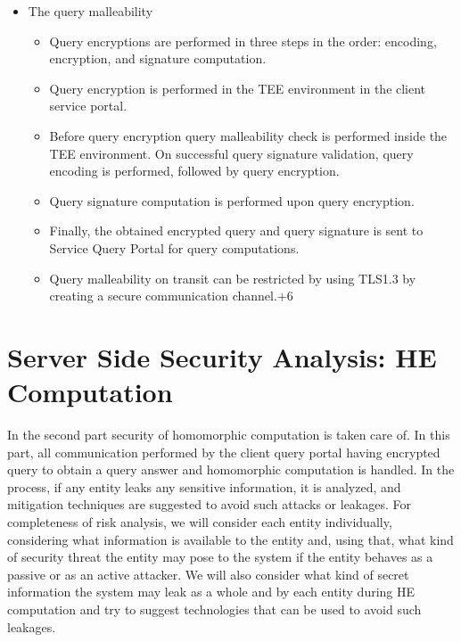 \begin{itemize}


    \item The query malleability
          \begin{itemize}
              \item Query encryptions are performed in three steps in the order: encoding, encryption, and signature computation.
              \item Query encryption is performed in the TEE environment in the client service portal.
              \item Before query encryption query malleability check is performed inside the TEE environment. On successful query signature validation, query encoding is performed, followed by query encryption.
              \item Query signature computation is performed upon query encryption.
              \item Finally, the obtained encrypted query and query signature is sent to Service Query Portal for query computations.
              \item Query malleability on transit can be restricted by using TLS1.3 by creating a secure communication channel.+6
          \end{itemize}
\end{itemize}


\section{Server Side Security Analysis: HE Computation}

In the second part security of homomorphic computation is taken care of. In this part, all communication performed by the client query portal having encrypted query to obtain a query answer and homomorphic computation is handled. In the process, if any entity leaks any sensitive information, it is analyzed, and mitigation techniques are suggested to avoid such attacks or leakages. For completeness of risk analysis, we will consider each entity individually, considering what information is available to the entity and, using that, what kind of security threat the entity may pose to the system if the entity behaves as a passive or as an active attacker. We will also consider what kind of secret information the system may leak as a whole and by each entity during HE computation and try to suggest technologies that can be used to avoid such leakages.


